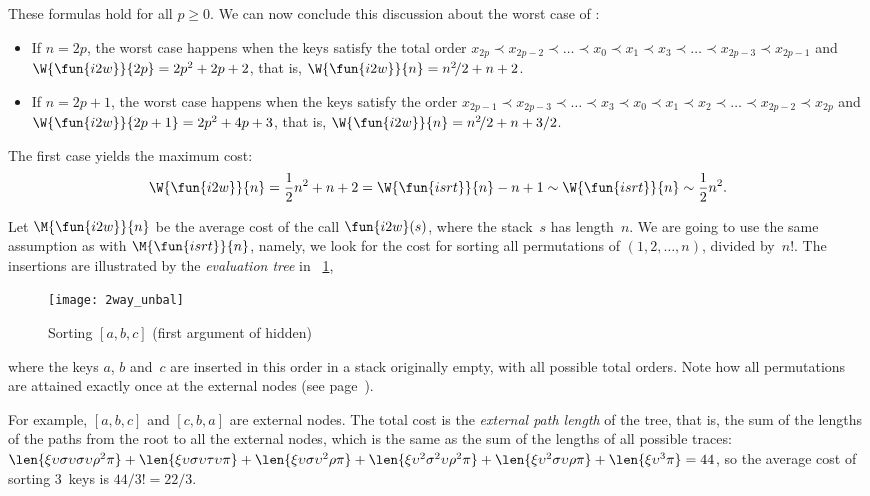 These formulas hold for all \(p \geqslant 0\). We can now conclude
this discussion about the worst case of :
\begin{itemize}

\item If \(n = 2p\), the worst case happens when the keys satisfy the
  total order \(x_{2p} \prec x_{2p-2} \prec \dots \prec x_0 \prec x_1
  \prec x_3 \prec \dots \prec x_{2p-3} \prec x_{2p-1}\) and
  \(\W{\fun{i2w}}{2p} = 2p^2 + 2p + 2\), that is, \(\W{\fun{i2w}}{n} =
  n^2\!/2 + n + 2\).

\item If \(n = 2p+1\), the worst case happens when the keys satisfy
  the order \(x_{2p-1} \prec x_{2p-3} \prec \dots \prec x_3 \prec x_0
  \prec x_1 \prec x_2 \prec \dots \prec x_{2p-2} \prec x_{2p}\) and
  \(\W{\fun{i2w}}{2p+1} = 2p^2 + 4p + 3\), that is, \(\W{\fun{i2w}}{n}
  = n^2\!/2 + n + 3/2\).

\end{itemize}
The first case yields the maximum cost:
\begin{equation*}
  \W{\fun{i2w}}{n} = \frac{1}{2}{n^2} + n + 2 = \W{\fun{isrt}}{n} - n
  + 1 \sim
  \W{\fun{isrt}}{n} \sim \frac{1}{2}{n^2}.
\end{equation*}



Let \(\M{\fun{i2w}}{n}\) be the average
cost of the call \(\fun{i2w}(s)\), where the
stack~\(s\) has length~\(n\). We are going to use the same assumption
as with \(\M{\fun{isrt}}{n}\), namely, we look for the cost for
sorting all permutations of \((1,2,\dots,n)\), divided by~\(n!\). The
insertions are illustrated by the \emph{evaluation
  tree} in \fig~\ref{fig:2way_unbal},
\begin{figure}[t]
\centering
\texttt{[image: 2way\_unbal]}
\caption{Sorting \([a,b,c]\) (first argument of  hidden)}
\label{fig:2way_unbal}
\end{figure}
where the keys \(a\), \(b\) and~\(c\) are inserted in this order in a
stack originally empty, with all possible total orders. Note how all
permutations are attained exactly once at the external
nodes (see
page~\pageref{def:external_node}).

For example, \([a,b,c]\) and \([c,b,a]\) are external nodes. The total
cost is the \emph{external path length}\label{external_path_length} of the tree, that is, the sum of
the lengths of the paths from the root to all the external nodes,
which is the same as the sum of the lengths of all possible
traces:
\(\len{\xi\upsilon\sigma\upsilon\sigma\upsilon\rho^2\pi} +
\len{\xi\upsilon\sigma\upsilon\tau\upsilon\pi} +
\len{\xi\upsilon\sigma\upsilon^2\rho\pi} +
\len{\xi\upsilon^2\sigma^2\upsilon\rho^2\pi} +
\len{\xi\upsilon^2\sigma\upsilon\rho\pi} + \len{\xi\upsilon^3\pi} =
44\), so the average cost of sorting \(3\)~keys is \(44/3! = 22/3\).

